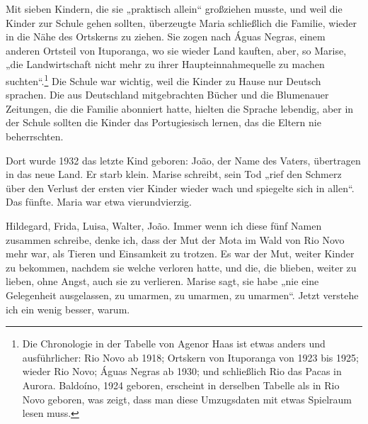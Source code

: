 \documentclass[
  ngerman,
  11pt,
  openany]{book}
\begin{document}
Mit sieben Kindern, die sie „praktisch allein`` großziehen musste, und
weil die Kinder zur Schule gehen sollten, überzeugte Maria schließlich
die Familie, wieder in die Nähe des Ortskerns zu ziehen. Sie zogen nach
Águas Negras, einem anderen Ortsteil von Ituporanga, wo sie wieder Land
kauften, aber, so Marise, „die Landwirtschaft nicht mehr zu ihrer
Haupteinnahmequelle zu machen suchten``.\footnote{Die Chronologie in der
  Tabelle von Agenor Haas ist etwas anders und ausführlicher: Rio Novo
  ab 1918; Ortskern von Ituporanga von 1923 bis 1925; wieder Rio Novo;
  Águas Negras ab 1930; und schließlich Rio das Pacas in Aurora.
  Baldoíno, 1924 geboren, erscheint in derselben Tabelle als in Rio Novo
  geboren, was zeigt, dass man diese Umzugsdaten mit etwas Spielraum
  lesen muss.} Die Schule war wichtig, weil die Kinder zu Hause nur
Deutsch sprachen. Die aus Deutschland mitgebrachten Bücher und die
Blumenauer Zeitungen, die die Familie abonniert hatte, hielten die
Sprache lebendig, aber in der Schule sollten die Kinder das
Portugiesisch lernen, das die Eltern nie beherrschten.

Dort wurde 1932 das letzte Kind geboren: João, der Name des Vaters,
übertragen in das neue Land. Er starb klein. Marise schreibt, sein Tod
„rief den Schmerz über den Verlust der ersten vier Kinder wieder wach
und spiegelte sich in allen``. Das fünfte. Maria war etwa
vierundvierzig.

Hildegard, Frida, Luisa, Walter, João. Immer wenn ich diese fünf Namen
zusammen schreibe, denke ich, dass der Mut der Mota im Wald von Rio Novo
mehr war, als Tieren und Einsamkeit zu trotzen. Es war der Mut, weiter
Kinder zu bekommen, nachdem sie welche verloren hatte, und die, die
blieben, weiter zu lieben, ohne Angst, auch sie zu verlieren. Marise
sagt, sie habe „nie eine Gelegenheit ausgelassen, zu umarmen, zu
umarmen, zu umarmen``. Jetzt verstehe ich ein wenig besser, warum.
\end{document}

